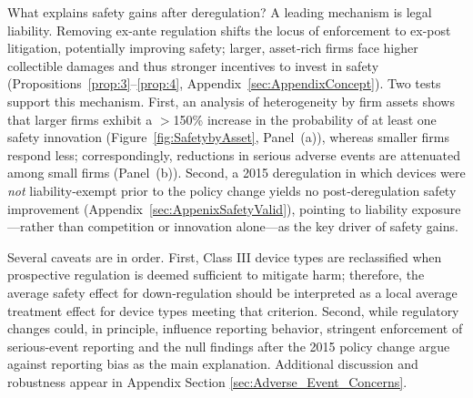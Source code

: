 \documentclass[letterpaper,12pt]{article}
\theoremstyle{definition}
\begin{document}
What explains safety gains after deregulation? A leading mechanism is legal liability. Removing ex-ante regulation shifts the locus of enforcement to ex-post litigation, potentially improving safety; larger, asset‐rich firms face higher collectible damages and thus stronger incentives to invest in safety (Propositions~\ref{prop:3}--\ref{prop:4}, Appendix~\ref{sec:AppendixConcept}). Two tests support this mechanism. First, an analysis of heterogeneity by firm assets shows that larger firms exhibit a $>$150\% increase in the probability of at least one safety innovation (Figure~\ref{fig:SafetybyAsset}, Panel~(a)), whereas smaller firms respond less; correspondingly, reductions in serious adverse events are attenuated among small firms (Panel~(b)).\footnotemark {} Second, a 2015 deregulation in which devices were \emph{not} liability‐exempt prior to the policy change yields no post‐deregulation safety improvement (Appendix~\ref{sec:AppenixSafetyValid}), pointing to liability exposure---rather than competition or innovation alone---as the key driver of safety gains.






Several caveats are in order. First, Class III device types are reclassified when prospective regulation is deemed sufficient to mitigate harm; therefore, the average safety effect for down‐regulation should be interpreted as a local average treatment effect for device types meeting that criterion. Second, while regulatory changes could, in principle, influence reporting behavior, stringent enforcement of serious-event reporting and the null findings after the 2015 policy change argue against reporting bias as the main explanation. Additional discussion and robustness appear in Appendix Section \ref{sec:Adverse_Event_Concerns}.

\end{document}
